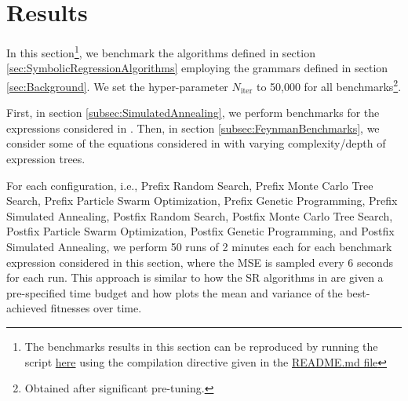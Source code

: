 \documentclass[runningheads]{llncs}
\begin{document}
\section{Results}\label{sec:Results}
In this section\footnote{The benchmarks results in this section can be reproduced by running the script \href{https://github.com/edfink234/Alpha-Zero-Symbolic-Regression/blob/0b5b6d0b56c2d108dda023a337edeb1084436da7/PrefixPostfixSR.cpp}{here} using the compilation directive given in the \href{https://github.com/edfink234/Alpha-Zero-Symbolic-Regression/blob/0b5b6d0b56c2d108dda023a337edeb1084436da7/README.md}{README.md file}}, we benchmark the algorithms defined in section \ref{sec:SymbolicRegressionAlgorithms} employing the grammars defined in section \ref{sec:Background}. We set the hyper-parameter $N_{\mathrm{iter}}$ to 50,000 for all benchmarks\footnote{Obtained after significant pre-tuning.}.
\par First, in section \ref{subsec:SimulatedAnnealing}, we perform benchmarks for the expressions considered in \cite{hemberg2008pre}. Then, in section \ref{subsec:FeynmanBenchmarks}, we consider some of the equations considered in \cite{udrescu2020ai} with varying complexity/depth of expression trees.
\par For each configuration, i.e., Prefix Random Search, Prefix Monte Carlo Tree Search, Prefix Particle Swarm Optimization, Prefix Genetic Programming,  Prefix Simulated Annealing, Postfix Random Search, Postfix Monte Carlo Tree Search, Postfix Particle Swarm Optimization, Postfix Genetic Programming, and Postfix Simulated Annealing, we perform 50 runs of 2 minutes each for each benchmark expression considered in this section, where the MSE is sampled every 6 seconds for each run.  
This approach is similar to how the SR algorithms in \cite{defranca2023interpretable} are given a pre-specified time budget and how \cite{manti2023discovering} plots the mean and variance of the best-achieved fitnesses over time. 
\end{document}
